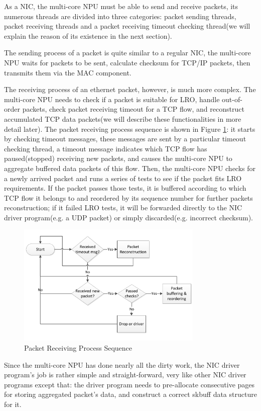 \documentclass[conference]{IEEEtran}
\begin{document}
As a NIC, the multi-core NPU must be able to send and receive packets, its numerous threads are divided into three categories: packet sending threads, packet receiving threads and a packet receiving timeout checking thread(we will explain the reason of its existence in the next section).

The sending process of a packet is quite similar to a regular NIC, the multi-core NPU waits for packets to be sent, calculate checksum for TCP/IP packets, then transmits them via the MAC component.

The receiving process of an ethernet packet, however, is much more complex. The multi-core NPU needs to check if a packet is suitable for LRO, handle out-of-order packets, check packet receiving timeout for a TCP flow, and reconstruct accumulated TCP data packets(we will describe these functionalities in more detail later). The packet receiving process sequence is shown in Figure \ref{packet receiving process sequence}: it starts by checking timeout messages, these messages are sent by a particular timeout checking thread, a timeout message indicates which TCP flow has paused(stopped) receiving new packets, and causes the multi-core NPU to aggregate buffered data packets of this flow. Then, the multi-core NPU checks for a newly arrived packet and runs a series of tests to see if the packet fits LRO requirements. If the packet passes those tests, it is buffered according to which TCP flow it belongs to and reordered by its sequence number for further packets reconstruction; if it failed LRO tests, it will be forwarded directly to the NIC driver program(e.g. a UDP packet) or simply discarded(e.g. incorrect checksum).
\begin{figure}[!t]
\centering
\includegraphics[width=3.5in]{packet_receiving_process_sequence}
\caption{Packet Receiving Process Sequence}
\label{packet receiving process sequence}
\end{figure}
Since the multi-core NPU has done nearly all the dirty work, the NIC driver program's job is rather simple and straight-forward, very like other NIC driver programs except that: the driver program needs to pre-allocate consecutive pages for storing aggregated packet's data, and construct a correct skbuff data structure for it.
\end{document}

